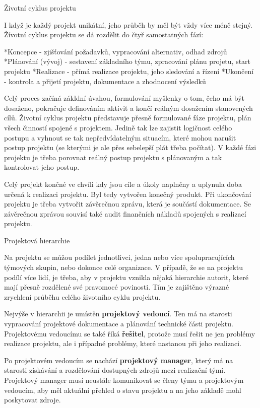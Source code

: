 \sec Životní cyklus projektu

I když je každý projekt unikátní, jeho průběh by měl být vždy více méně stejný. Žívotní cyklus projektu se dá rozdělit do čtyř samostatných fází:

\begitems
*Koncepce - zjišťování požadavků, vypracování alternativ, odhad zdrojů
*Plánování (vývoj) - sestavení základního týmu, zpracování plánu projetu, start projektu
*Realizace - přímá realizace projektu, jeho sledování a řízení
*Ukončení - kontrola a přijetí projektu, dokumentace a zhodnocení výsledků
\enditems

Celý proces začíná zákldní úvahou, formulování myšlenky o tom, čeho má být dosaženo, pokračuje definováním aktivit a končí reálným dosažením stanovených cílů. Životní cyklus projektu představuje přesně formulované fáze projektu, plán všech činností spojené s projektem. Jedině tak lze zajistit logičnost celého postupu a vyhnout se tak nepředvídatelným situacím, které mohou narušit postup projektu (se kterými je ale přes sebelepší plát třeba počítat). V každé fázi projektu je třeba porovnat reálný postup projektu s plánovaným a tak kontrolovat jeho postup.

Celý projekt končné ve chvíli kdy jsou cíle a úkoly naplněny a uplynula doba určená k realizaci projektu. Byl tedy vytvořen konečný produkt. Při ukončování projektu je třeba vytvořit závěrečnou zprávu, která je součástí dokumentace. Se závěrečnou zprávou souvisí také audit finančních nákladů spojených s realizací projektu.

\sec Projektová hierarchie

Na projektu se můžou podílet jednotlivci, jedna nebo více spolupracujících týmových skupin, nebo dokonce celé organizace. V případě, že se na projektu podílí více lidí, je třeba, aby v projektu vznikla nějaká hierarchie autorit, které mají přesně rozdělené své pravomocé povinosti. Tím je zajištěno výrazné zrychlení průběhu celého životního cyklu projektu.

Nejvýše v hierarchii je umístěn {\bf projektový vedoucí}. Ten má na starosti vypracování projektové dokumentace a plánování technické části projektu. Projektovému vedoucímu se také říká {\bf řešitel}, protože musí řešit ne jen problémy realizace projektu, ale i případné problémy, které nastanou při jeho realizaci. 

Po projektovém vedoucím se nachází {\bf projektový manager}, který má na starosti získávání a rozdělování dostupných zdrojů mezi realizační tými. Projektový manager musí neustále komunikovat se členy týmu a projektovým vedoucím, aby měl aktuální přehled o stavu projektu a na jeho základě mohl poskytovat zdroje. 

